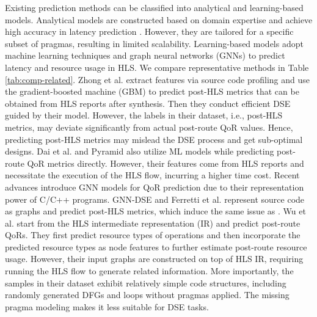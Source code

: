 \documentclass[conference]{IEEEtran}
\begin{document}
Existing prediction methods can be classified into analytical and learning-based models. Analytical models are constructed based on domain expertise and achieve high accuracy in latency prediction \cite{zhao2017comba, choi17}. However, they are tailored for a specific subset of pragmas, resulting in limited scalability. Learning-based models adopt machine learning techniques \cite{7927161, dai2018fast, makrani2019pyramid} and graph neural networks (GNNs) \cite{sohrabizadeh2022gnn, ferretti2022graph,wu2022high} to predict latency and resource usage in HLS. We compare representative methods in Table \ref{tab:comp-related}. Zhong et al. \cite{7927161} extract features via source code profiling and use the gradient-boosted machine (GBM) to predict post-HLS metrics that can be obtained from HLS reports after synthesis. Then they conduct efficient DSE guided by their model. However, the labels in their dataset, i.e., post-HLS metrics, may deviate significantly from actual post-route QoR values. Hence, predicting post-HLS metrics may mislead the DSE process and get sub-optimal designs. Dai et al. \cite{dai2018fast} and Pyramid \cite{makrani2019pyramid} also utilize ML models while predicting post-route QoR metrics directly. However, their features come from HLS reports and necessitate the execution of the HLS flow, incurring a higher time cost. Recent advances introduce GNN models for QoR prediction due to their representation power of C/C++ programs. GNN-DSE \cite{sohrabizadeh2022gnn} and Ferretti et al. \cite{ferretti2022graph} represent source code as graphs and predict post-HLS metrics, which induce the same issue as \cite{7927161}. Wu et al. \cite{wu2022high} start from the HLS intermediate representation (IR) and predict post-route QoRs. They first predict resource types of operations and then incorporate the predicted resource types as node features to further estimate post-route resource usage. However, their input graphs are constructed on top of HLS IR, requiring running the HLS flow to generate related information. More importantly, the samples in their dataset exhibit relatively simple code structures, including randomly generated DFGs and loops without pragmas applied. The missing pragma modeling makes it less suitable for DSE tasks.    


\end{document}
